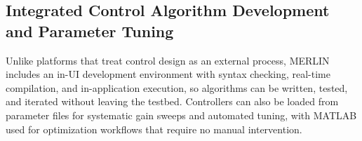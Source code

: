 \documentclass[a4paper, 10pt, conference]{ieeeconf}      %
\begin{document}



\subsection{Integrated Control Algorithm Development and Parameter Tuning}
Unlike platforms that treat control design as an external process, MERLIN includes an in-UI development environment with syntax checking, real-time compilation, and in-application execution, so algorithms can be written, tested, and iterated without leaving the testbed. Controllers can also be loaded from parameter files for systematic gain sweeps and automated tuning, with MATLAB used for optimization workflows that require no manual intervention.
\end{document}
